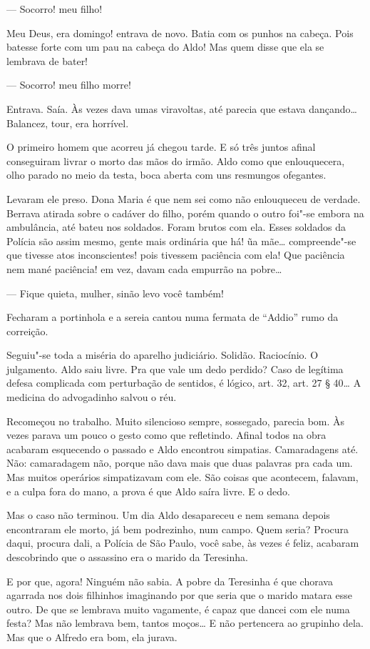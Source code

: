 \begin{linenumbers}
--- Socorro! meu filho!

Meu Deus, era domingo! entrava de novo. Batia com os punhos na cabeça.
Pois batesse forte com um pau na cabeça do Aldo! Mas quem disse que ela
se lembrava de bater!

--- Socorro! meu filho morre!

Entrava. Saía. Às vezes dava umas viravoltas, até parecia que estava
dançando\ldots{} Balancez, tour, era horrível.

O primeiro homem que acorreu já chegou tarde. E só três juntos afinal
conseguiram livrar o morto das mãos do irmão. Aldo como que
enlouquecera, olho parado no meio da testa, boca aberta com uns
resmungos ofegantes.

Levaram ele preso. Dona Maria é que nem sei como não enlouqueceu de
verdade. Berrava atirada sobre o cadáver do filho, porém quando o outro
foi"-se embora na ambulância, até bateu nos soldados. Foram brutos com
ela. Esses soldados da Polícia são assim mesmo, gente mais ordinária que
há! ũa mãe\ldots{} compreende"-se que tivesse atos inconscientes! pois
tivessem paciência com ela! Que paciência nem mané paciência! em vez,
davam cada empurrão na pobre\ldots{}

--- Fique quieta, mulher, sinão levo você também!

Fecharam a portinhola e a sereia cantou numa fermata de ``Addio'' rumo
da correição.

Seguiu"-se toda a miséria do aparelho judiciário. Solidão. Raciocínio. O
julgamento. Aldo saiu livre. Pra que vale um dedo perdido? Caso de
legítima defesa complicada com perturbação de sentidos, é lógico, art.
32, art. 27 § 40\ldots{} A medicina do advogadinho salvou o réu.

Recomeçou no trabalho. Muito silencioso sempre, sossegado, parecia bom.
Às vezes parava um pouco o gesto como que refletindo. Afinal todos na
obra acabaram esquecendo o passado e Aldo encontrou simpatias.
Camaradagens até. Não: camaradagem não, porque não dava mais que duas
palavras pra cada um. Mas muitos operários simpatizavam com ele. São
coisas que acontecem, falavam, e a culpa fora do mano, a prova é que
Aldo saíra livre. E o dedo.

Mas o caso não terminou. Um dia Aldo desapareceu e nem semana depois
encontraram ele morto, já bem podrezinho, num campo. Quem seria? Procura
daqui, procura dali, a Polícia de São Paulo, você sabe, às vezes é
feliz, acabaram descobrindo que o assassino era o marido da Teresinha.

E por que, agora! Ninguém não sabia. A pobre da Teresinha é que chorava
agarrada nos dois filhinhos imaginando por que seria que o marido matara
esse outro. De que se lembrava muito vagamente, é capaz que dancei com
ele numa festa? Mas não lembrava bem, tantos moços\ldots{} E não pertencera
ao grupinho dela. Mas que o Alfredo era bom, ela jurava.


\end{linenumbers}
